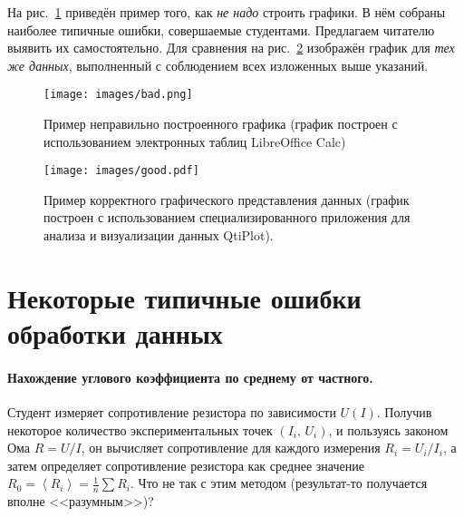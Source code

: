 На рис.~\ref{fig:incorrect} приведён пример того, как \emph{не надо}
строить графики. В нём собраны наиболее типичные ошибки, совершаемые
студентами. Предлагаем читателю выявить их самостоятельно. Для сравнения
на рис.~\ref{fig:correct} изображён график для \emph{тех же данных},
выполненный с соблюдением всех изложенных выше указаний.
\begin{figure}[ht]
\begin{centering}
\texttt{[image: images/bad.png]}
\par\end{centering}
\caption{\label{fig:incorrect}Пример неправильно построенного графика (график
построен с использованием электронных таблиц LibreOffice Calc)}
\end{figure}
\begin{figure}[h!]
\begin{centering}
\texttt{[image: images/good.pdf]}
\par\end{centering}
\caption{\label{fig:correct}Пример корректного графического представления
данных (график построен с использованием специализированного приложения
для анализа и визуализации данных QtiPlot).}
\end{figure}


\section{Некоторые типичные ошибки обработки данных}

\paragraph{Нахождение углового коэффициента по среднему от частного.}

Студент измеряет сопротивление резистора по зависимости $U\!\left(I\right)$.
Получив некоторое количество экспериментальных точек $\left(I_{i},\,U_{i}\right)$,
и пользуясь законом Ома $R=U/I$, он вычисляет сопротивление для каждого
измерения $R_{i}=U_{i}/I_{i}$, а затем определяет сопротивление резистора
как среднее значение $R_{0}=\left\langle R_{i}\right\rangle =\frac{1}{n}\sum R_{i}$.
Что не так с этим методом (результат-то получается вполне <<разумным>>)?

